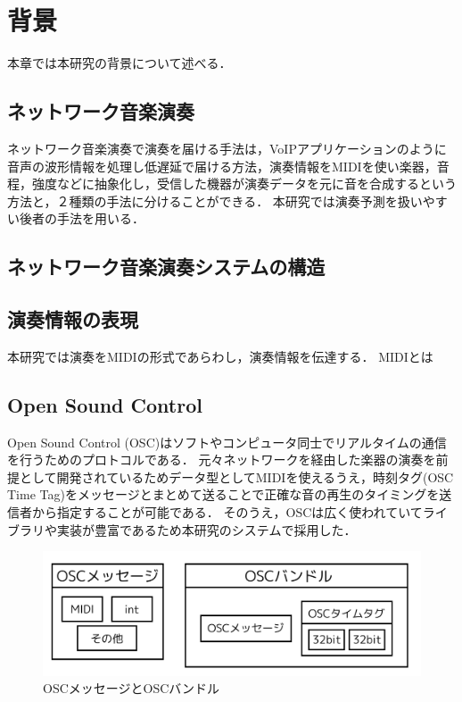 \chapter{背景}
\label{background}

本章では本研究の背景について述べる．

\section{ネットワーク音楽演奏}
ネットワーク音楽演奏で演奏を届ける手法は，VoIPアプリケーションのように音声の波形情報を処理し低遅延で届ける方法\cite{syncroom}\cite{lola}\cite{jacktrip}，演奏情報をMIDIを使い楽器，音程，強度などに抽象化し，受信した機器が演奏データを元に音を合成するという方法\cite{rtpmidi}\cite{sourcenode}と，２種類の手法に分けることができる．
本研究では演奏予測を扱いやすい後者の手法を用いる．

\section{ネットワーク音楽演奏システムの構造}

\section{演奏情報の表現}
本研究では演奏をMIDIの形式であらわし，演奏情報を伝達する．
MIDIとは

\section{Open Sound Control}
Open Sound Control (OSC)\cite{opensoundcontrol}はソフトやコンピュータ同士でリアルタイムの通信を行うためのプロトコルである．
元々ネットワークを経由した楽器の演奏を前提として開発されているためデータ型としてMIDIを使えるうえ，時刻タグ(OSC Time Tag)をメッセージとまとめて送ることで正確な音の再生のタイミングを送信者から指定することが可能である．
そのうえ，OSCは広く使われていてライブラリや実装が豊富であるため本研究のシステムで採用した．

\begin{figure}[htbp]
  \centering
  \includegraphics[width=0.8\linewidth]{src/img/g1736.png}
  \caption{OSCメッセージとOSCバンドル}
  \label{fig:oscmess}
\end{figure}

